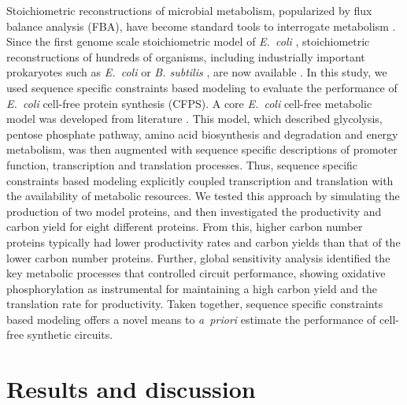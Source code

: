 \documentclass[journal=asbcd6,manuscript=article]{achemso}
\begin{document}
Stoichiometric reconstructions of microbial metabolism, popularized by flux balance analysis (FBA), have become standard tools to interrogate metabolism \cite{2012_lewis_palsson_NatRevMicrobio}.
Since the first genome scale stoichiometric model of \textit{E.~coli} \cite{2000_edwards_palsson_PNAS}, stoichiometric reconstructions of hundreds of organisms, including industrially important prokaryotes such as \textit{E.~coli} \cite{Feist:2007aa} or \textit{B. subtilis} \cite{Oh:2007aa}, are now available \cite{2009_feist_palsson_NatRevMicrobio}.
In this study, we used sequence specific constraints based modeling to evaluate the performance of \emph{E.~coli} cell-free protein synthesis (CFPS).
A core \emph{E.~coli} cell-free metabolic model was developed from literature \cite{Feist:2007aa}.
This model, which described glycolysis, pentose phosphate pathway, amino acid biosynthesis and degradation and energy metabolism, was then augmented with
sequence specific descriptions of promoter function, transcription and translation processes.
Thus, sequence specific constraints based modeling explicitly coupled transcription and translation with the availability of metabolic resources.
We tested this approach by simulating the production of two model proteins, and then investigated the productivity and carbon yield for eight different proteins.
From this, higher carbon number proteins typically had lower productivity rates and carbon yields than that of the lower carbon number proteins.
Further, global sensitivity analysis identified the key metabolic processes that controlled circuit performance, showing oxidative phosphorylation as instrumental for maintaining a high carbon yield and the translation rate for productivity.
Taken together, sequence specific constraints based modeling offers a novel means to \emph{a~priori} estimate the performance of cell-free synthetic circuits.

\clearpage

\section{Results and discussion}


\end{document}

